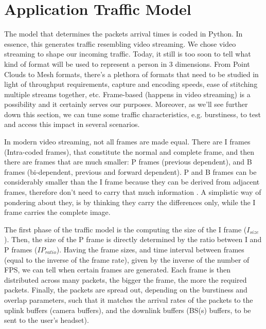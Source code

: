 \section{Application Traffic Model}
\label{sec:at}

The model that determines the packets arrival times is coded in Python.
In essence, this generates traffic resembling video streaming. We chose video streaming to shape our incoming traffic. Today, it still is too soon to tell what kind of format will be used to represent a person in 3 dimensions. From Point Clouds to Mesh formats, there's a plethora of formats that need to be studied in light of throughput requirements, capture and encoding speeds, ease of stitching multiple streams together, etc. Frame-based (happens in video streaming) is a possibility and it certainly serves our purposes. Moreover, as we'll see further down this section, we can tune some traffic characteristics, e.g. burstiness, to test and access this impact in several scenarios.

In modern video streaming, not all frames are made equal. There are I frames (Intra-coded frames), that constitute the normal and complete frame, and then there are frames that are much smaller: P frames (previous dependent), and B frames (bi-dependent, previous and forward dependent). P and B frames can be considerably smaller than the I frame because they can be derived from adjacent frames, therefore don't need to carry that much information \cite{wiki:video_frames}. A simplistic way of pondering about they, is by thinking they carry the differences only, while the I frame carries the complete image.


The first phase of the traffic model is the computing the size of the I frame ($I_{size}$). Then, the size of the P frame is directly determined by the ratio between I and P frames ($IP_{ratio}$). Having the frame sizes, and time interval between frames (equal to the inverse of the frame rate), given by the inverse of the number of \ac{FPS}, we can tell when certain frames are generated. Each frame is then distributed across many packets, the bigger the frame, the more the required packets. Finally, the packets are spread out, depending on the burstiness and overlap parameters, such that it matches the arrival rates of the packets to the uplink buffers (camera buffers), and the downlink buffers (\acs{BS}(s) buffers, to be sent to the user's headset).



